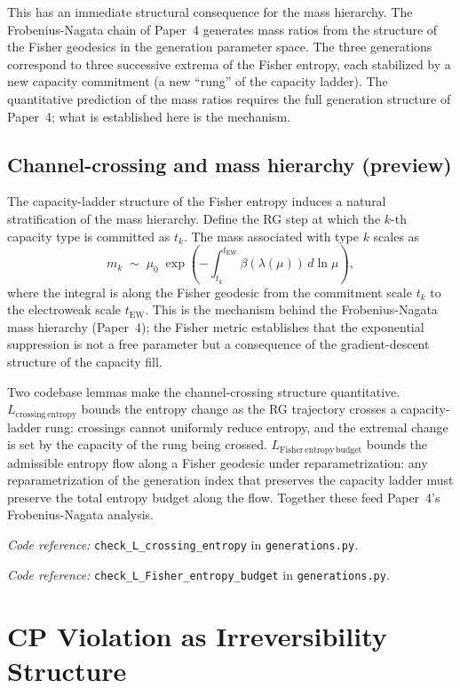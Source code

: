 \documentclass[11pt]{article}
\newcommand{\coderef}[2]{\smallskip\noindent\textit{Code reference:} \texttt{#1} in \texttt{#2}.}
\begin{document}
This has an immediate structural consequence for the mass hierarchy.  The
Frobenius-Nagata chain of Paper~4 generates mass ratios from the structure
of the Fisher geodesics in the generation parameter space.  The three
generations correspond to three successive extrema of the Fisher entropy,
each stabilized by a new capacity commitment (a new ``rung'' of the capacity
ladder).  The quantitative prediction of the mass ratios requires the full
generation structure of Paper~4; what is established here is the mechanism.

\subsection{Channel-crossing and mass hierarchy (preview)}

The capacity-ladder structure of the Fisher entropy induces a natural
stratification of the mass hierarchy.  Define the RG step at which the
$k$-th capacity type is committed as $t_k$.  The mass associated with type
$k$ scales as
\[
  m_k \;\sim\; \mu_0 \;\exp\!\left(-\int_{t_k}^{t_{\mathrm{EW}}}
  \beta(\lambda(\mu))\,d\ln\mu\right),
\]
where the integral is along the Fisher geodesic from the commitment scale
$t_k$ to the electroweak scale $t_{\mathrm{EW}}$.  This is the mechanism
behind the Frobenius-Nagata mass hierarchy (Paper~4); the Fisher metric
establishes that the exponential suppression is not a free parameter but a
consequence of the gradient-descent structure of the capacity fill.

Two codebase lemmas make the channel-crossing structure quantitative.
$L_{\mathrm{crossing\,entropy}}$ bounds the entropy change as the RG
trajectory crosses a capacity-ladder rung: crossings cannot uniformly
reduce entropy, and the extremal change is set by the capacity of the
rung being crossed.  $L_{\mathrm{Fisher\,entropy\,budget}}$ bounds the
admissible entropy flow along a Fisher geodesic under reparametrization:
any reparametrization of the generation index that preserves the capacity
ladder must preserve the total entropy budget along the flow.  Together
these feed Paper~4's Frobenius-Nagata analysis.

\coderef{check\_L\_crossing\_entropy}{generations.py}

\coderef{check\_L\_Fisher\_entropy\_budget}{generations.py}


\section{CP Violation as Irreversibility Structure}
\label{sec:cp}
\end{document}
